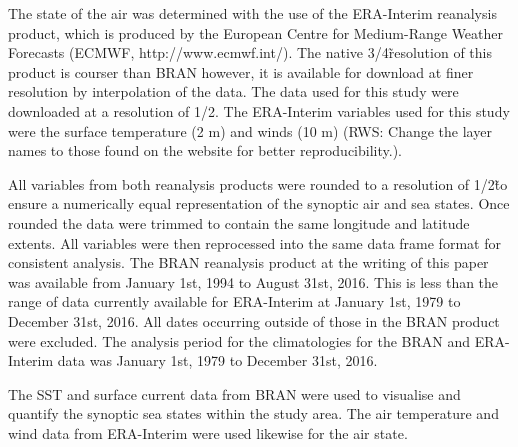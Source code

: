 \documentclass[a4paper,10pt,review]{elsarticle}
\begin{document}
The state of the air was determined with the use of the ERA-Interim reanalysis product, which is produced by the European Centre for Medium-Range Weather Forecasts (ECMWF, http://www.ecmwf.int/). The native 3/4\degree\~ resolution of this product is courser than BRAN however, it is available for download at finer resolution by interpolation of the data. The data used for this study were downloaded at a resolution of 1/2\degree. The ERA-Interim variables used for this study were the surface temperature (2 m) and winds (10 m) (RWS: Change the layer names to those found on the website for better reproducibility.). 

All variables from both reanalysis products were rounded to a resolution of 1/2\degree\~ to ensure a numerically equal representation of the synoptic air and sea states. Once rounded the data were trimmed to contain the same longitude and latitude extents. All variables were then reprocessed into the same data frame format for consistent analysis. The BRAN reanalysis product at the writing of this paper was available from January 1st, 1994 to August 31st, 2016. This is less than the range of data currently available for ERA-Interim at January 1st, 1979 to December 31st, 2016. All dates occurring outside of those in the BRAN product were excluded. The analysis period for the climatologies for the BRAN and ERA-Interim data was January 1st, 1979 to December 31st, 2016.

The SST and surface current data from BRAN were used to visualise and quantify the synoptic sea states within the study area. The air temperature and wind data from ERA-Interim were used likewise for the air state.
\end{document}
